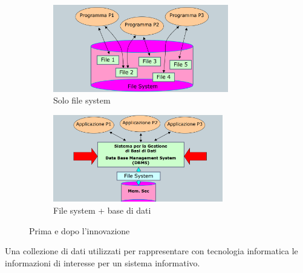 \documentclass[a4paper, 12pt]{book}
\begin{document}
    \begin{figure}[h]
      \centering

      \begin{subfigure}[b]{0.45\textwidth}
        \centering
        \includegraphics[width=\textwidth, height=3.8cm]{images/fileSystem.png}
        \caption{Solo file system}
      \end{subfigure}
      \hfill
      \begin{subfigure}[b]{0.45\textwidth}
        \centering
        \includegraphics[width=\textwidth, height=3.8cm]{images/DBMS.png}
        \caption{File system + base di dati}
     \end{subfigure}

    \caption{Prima e dopo l'innovazione}
    \end{figure}




    \vspace{15pt}

    \begin{tcolorbox}[
      colback=cyan!5!white,
      colframe=blue!50!black,
      title=\textbf{Definizione - Base di dati},
      coltitle=white,
      fonttitle=\bfseries,
      arc=3mm,
      boxrule=0.5pt,
      enhanced,
      breakable
    ]
    Una collezione di dati utilizzati per rappresentare con tecnologia informatica le informazioni di interesse per un sistema informativo.
    \end{tcolorbox}

    \vspace{15pt}

\end{document}
